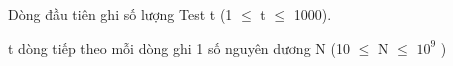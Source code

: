 Dòng đầu tiên ghi số lượng Test t (1  $\le$  t  $\le$  1000).  

   t dòng tiếp theo mỗi dòng ghi 1 số nguyên dương N (10  $\le$  N  $\le$  $10^{9}$   )